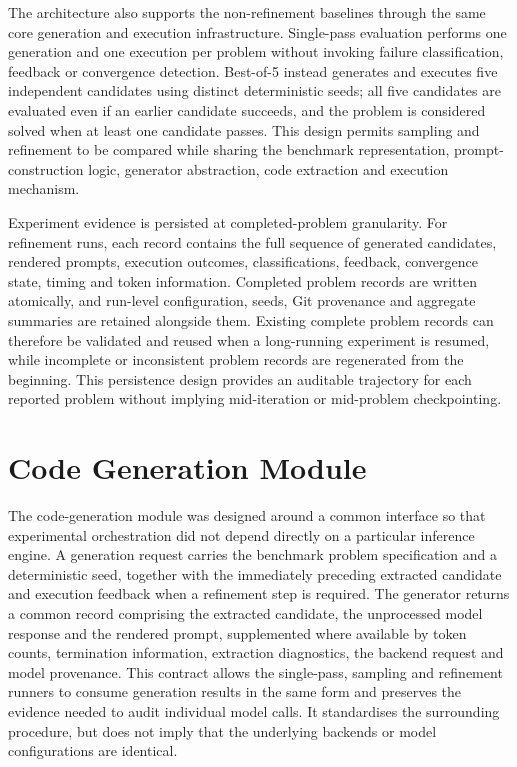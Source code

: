 The architecture also supports the non-refinement baselines through the same core generation and execution infrastructure. Single-pass evaluation performs one generation and one execution per problem without invoking failure classification, feedback or convergence detection. Best-of-5 instead generates and executes five independent candidates using distinct deterministic seeds; all five candidates are evaluated even if an earlier candidate succeeds, and the problem is considered solved when at least one candidate passes. This design permits sampling and refinement to be compared while sharing the benchmark representation, prompt-construction logic, generator abstraction, code extraction and execution mechanism.

Experiment evidence is persisted at completed-problem granularity. For refinement runs, each record contains the full sequence of generated candidates, rendered prompts, execution outcomes, classifications, feedback, convergence state, timing and token information. Completed problem records are written atomically, and run-level configuration, seeds, Git provenance and aggregate summaries are retained alongside them. Existing complete problem records can therefore be validated and reused when a long-running experiment is resumed, while incomplete or inconsistent problem records are regenerated from the beginning. This persistence design provides an auditable trajectory for each reported problem without implying mid-iteration or mid-problem checkpointing.

\section{Code Generation Module}

The code-generation module was designed around a common interface so that experimental orchestration did not depend directly on a particular inference engine. A generation request carries the benchmark problem specification and a deterministic seed, together with the immediately preceding extracted candidate and execution feedback when a refinement step is required. The generator returns a common record comprising the extracted candidate, the unprocessed model response and the rendered prompt, supplemented where available by token counts, termination information, extraction diagnostics, the backend request and model provenance. This contract allows the single-pass, sampling and refinement runners to consume generation results in the same form and preserves the evidence needed to audit individual model calls. It standardises the surrounding procedure, but does not imply that the underlying backends or model configurations are identical.

